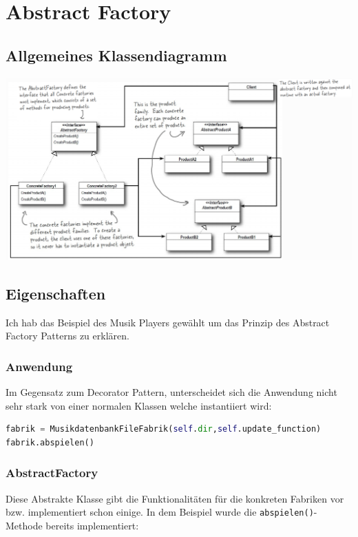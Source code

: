 \clearpage
\section{Abstract Factory}
\subsection{Allgemeines Klassendiagramm}
\cite{RAFMa}

\begin{minipage}{\linewidth}
	\centering
	\includegraphics[width=1\linewidth]{images/uml_general2}
\end{minipage}

\subsection{Eigenschaften}
Ich hab das Beispiel des Musik Players gewählt um das Prinzip des Abstract Factory Patterns zu erklären. 

\subsubsection{Anwendung}
Im Gegensatz zum Decorator Pattern, unterscheidet sich die Anwendung nicht sehr stark von einer normalen Klassen welche instantiiert wird:

\begin{lstlisting}[language=python]
fabrik = MusikdatenbankFileFabrik(self.dir,self.update_function)
fabrik.abspielen()
\end{lstlisting}
\clearpage
\subsubsection{AbstractFactory}
Diese Abstrakte Klasse gibt die Funktionalitäten für die konkreten Fabriken vor bzw. implementiert schon einige. In dem Beispiel wurde die \verb|abspielen()|-Methode bereits implementiert:

